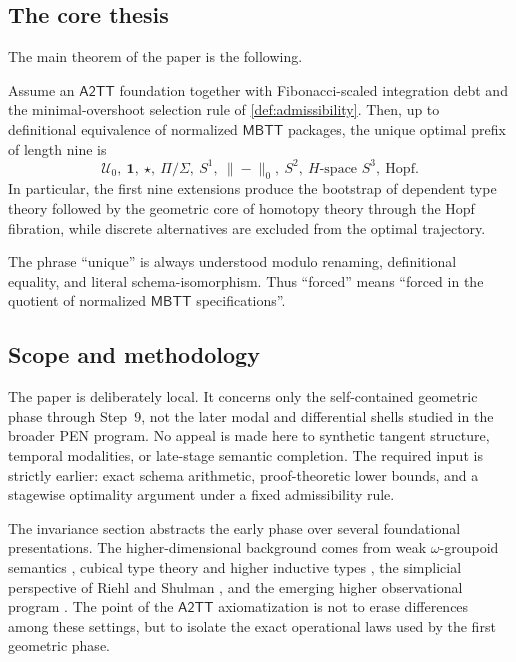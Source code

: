 \documentclass{lmcs}
\newcommand{\U}{\mathcal{U}}
\newcommand{\MBTT}{\mathsf{MBTT}}
\newcommand{\ATwoTT}{\mathsf{A2TT}}
\newcommand{\Trunc}[1]{\|#1\|_0}
\begin{document}
\subsection{The core thesis}

The main theorem of the paper is the following.

\begin{thm}
\label{thm:main}
Assume an $\ATwoTT$ foundation together with Fibonacci-scaled integration debt and the minimal-overshoot selection rule of \autoref{def:admissibility}. Then, up to definitional equivalence of normalized $\MBTT$ packages, the unique optimal prefix of length nine is
\[
  \U_0,\ \mathbf 1,\ \star,\ \Pi/\Sigma,\ S^1,\ \Trunc{-},\ S^2,\ \text{$H$-space }S^3,\ \text{Hopf}.
\]
In particular, the first nine extensions produce the bootstrap of dependent type theory followed by the geometric core of homotopy theory through the Hopf fibration, while discrete alternatives are excluded from the optimal trajectory.
\end{thm}

The phrase ``unique'' is always understood modulo renaming, definitional equality, and literal schema-isomorphism. Thus ``forced'' means ``forced in the quotient of normalized $\MBTT$ specifications''.

\subsection{Scope and methodology}

The paper is deliberately local. It concerns only the self-contained geometric phase through Step~9, not the later modal and differential shells studied in the broader PEN program. No appeal is made here to synthetic tangent structure, temporal modalities, or late-stage semantic completion. The required input is strictly earlier: exact schema arithmetic, proof-theoretic lower bounds, and a stagewise optimality argument under a fixed admissibility rule.

The invariance section abstracts the early phase over several foundational presentations. The higher-dimensional background comes from weak $\omega$-groupoid semantics \cite{lumsdaine,vdberg-garner}, cubical type theory and higher inductive types \cite{cubical,cchm-hits}, the simplicial perspective of Riehl and Shulman \cite{riehl-shulman}, and the emerging higher observational program \cite{aks-hott,altenkirch-param}. The point of the $\ATwoTT$ axiomatization is not to erase differences among these settings, but to isolate the exact operational laws used by the first geometric phase.
\end{document}
